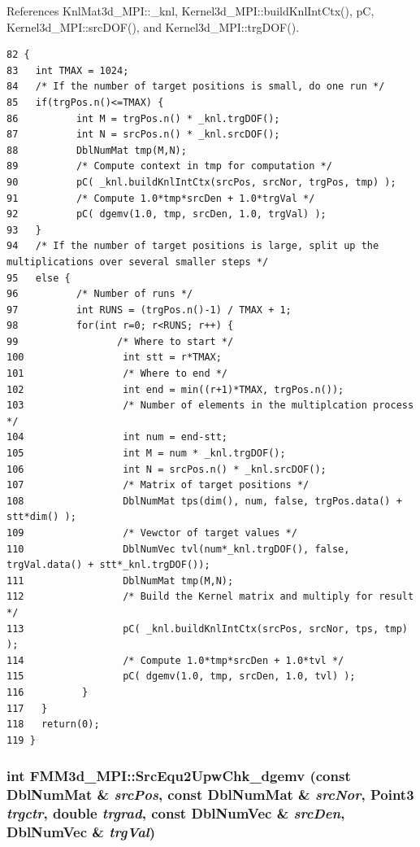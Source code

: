 References Knl\-Mat3d\_\-MPI::\_\-knl, Kernel3d\_\-MPI::build\-Knl\-Int\-Ctx(), p\-C, Kernel3d\_\-MPI::src\-DOF(), and Kernel3d\_\-MPI::trg\-DOF().

\footnotesize\begin{verbatim}82 {
83   int TMAX = 1024;
84   /* If the number of target positions is small, do one run */
85   if(trgPos.n()<=TMAX) {
86          int M = trgPos.n() * _knl.trgDOF();
87          int N = srcPos.n() * _knl.srcDOF();
88          DblNumMat tmp(M,N);
89          /* Compute context in tmp for computation */
90          pC( _knl.buildKnlIntCtx(srcPos, srcNor, trgPos, tmp) );
91          /* Compute 1.0*tmp*srcDen + 1.0*trgVal */
92          pC( dgemv(1.0, tmp, srcDen, 1.0, trgVal) );
93   }
94   /* If the number of target positions is large, split up the multiplications over several smaller steps */
95   else {
96          /* Number of runs */
97          int RUNS = (trgPos.n()-1) / TMAX + 1;
98          for(int r=0; r<RUNS; r++) {
99                 /* Where to start */
100                 int stt = r*TMAX;
101                 /* Where to end */
102                 int end = min((r+1)*TMAX, trgPos.n());
103                 /* Number of elements in the multiplcation process */
104                 int num = end-stt;
105                 int M = num * _knl.trgDOF();
106                 int N = srcPos.n() * _knl.srcDOF();
107                 /* Matrix of target positions */
108                 DblNumMat tps(dim(), num, false, trgPos.data() + stt*dim() );
109                 /* Vewctor of target values */
110                 DblNumVec tvl(num*_knl.trgDOF(), false, trgVal.data() + stt*_knl.trgDOF());
111                 DblNumMat tmp(M,N);
112                 /* Build the Kernel matrix and multiply for result */
113                 pC( _knl.buildKnlIntCtx(srcPos, srcNor, tps, tmp) );
114                 /* Compute 1.0*tmp*srcDen + 1.0*tvl */
115                 pC( dgemv(1.0, tmp, srcDen, 1.0, tvl) );
116          }
117   }
118   return(0);
119 }
\end{verbatim}\normalsize 


\subsubsection{\setlength{\rightskip}{0pt plus 5cm}int FMM3d\_\-MPI::Src\-Equ2Upw\-Chk\_\-dgemv (const Dbl\-Num\-Mat \& {\em src\-Pos}, const Dbl\-Num\-Mat \& {\em src\-Nor}, Point3 {\em trgctr}, double {\em trgrad}, const Dbl\-Num\-Vec \& {\em src\-Den}, Dbl\-Num\-Vec \& {\em trg\-Val})\hspace{0.3cm}{\tt  [protected]}}\label{classFMM3d__MPI_572c0e206f9017f82fce670ce7a92208_572c0e206f9017f82fce670ce7a92208}


